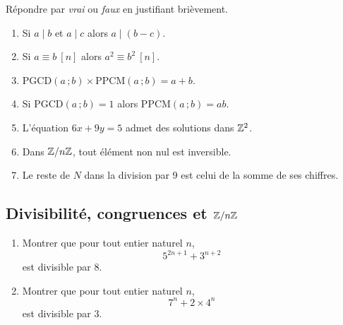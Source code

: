 Répondre par \emph{vrai} ou \emph{faux} en justifiant brièvement.
\begin{enumerate}
	\item Si $a \mid b$ et $a \mid c$ alors $a \mid (b - c)$.
	\item Si $a \equiv b\ [n]$ alors $a^2 \equiv b^2\ [n]$.
	\item $\mathrm{PGCD}(a\,;b) \times \mathrm{PPCM}(a\,;b) = a + b$.
	\item Si $\mathrm{PGCD}(a\,;b) = 1$ alors $\mathrm{PPCM}(a\,;b) = ab$.
	\item L'équation $6x + 9y = 5$ admet des solutions dans $\mathbb{Z}^2$.
	\item Dans $\mathbb{Z}/n\mathbb{Z}$, tout élément non nul est inversible.
	\item Le reste de $N$ dans la division par $9$ est celui de la somme de ses
	chiffres.
\end{enumerate}

\subsection{Divisibilité, congruences et $\mathbb{Z}/n\mathbb{Z}$}










\begin{enumerate}
	\item Montrer que pour tout entier naturel $n$,
	$$
	5^{2n+1} + 3^{n+2}
	$$
	est divisible par $8$.

	\item Montrer que pour tout entier naturel $n$,
	$$
	7^n + 2 \times 4^n
	$$
	est divisible par $3$.
\end{enumerate}



